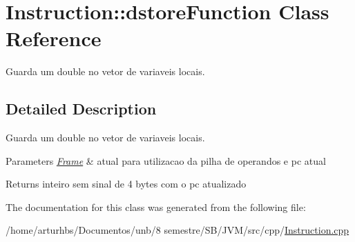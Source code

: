 \hypertarget{classInstruction_1_1dstoreFunction}{}\section{Instruction\+:\+:dstore\+Function Class Reference}
\label{classInstruction_1_1dstoreFunction}


Guarda um double no vetor de variaveis locais.  




\subsection{Detailed Description}
Guarda um double no vetor de variaveis locais. 


\begin{DoxyParams}{Parameters}
{\em \hyperlink{classFrame}{Frame}} & atual para utilizacao da pilha de operandos e pc atual \\
\hline
\end{DoxyParams}
\begin{DoxyReturn}{Returns}
inteiro sem sinal de 4 bytes com o pc atualizado 
\end{DoxyReturn}


The documentation for this class was generated from the following file\+:\begin{DoxyCompactItemize}
\item 
/home/arturhbs/\+Documentos/unb/8 semestre/\+S\+B/\+J\+V\+M/src/cpp/\hyperlink{Instruction_8cpp}{Instruction.\+cpp}\end{DoxyCompactItemize}
